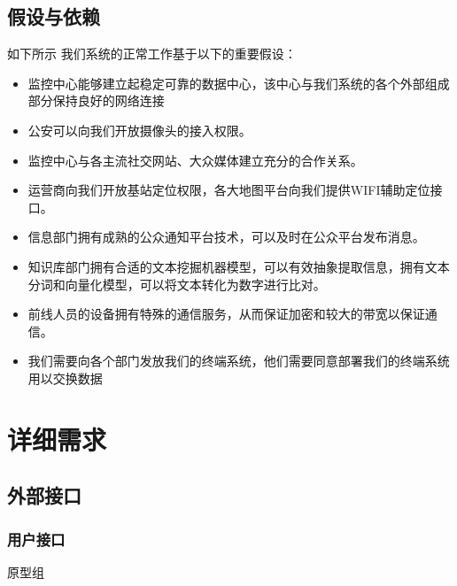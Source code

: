 \documentclass{ctexrep}
\begin{document}
\section{假设与依赖}
如下所示 我们系统的正常工作基于以下的重要假设：
\begin{itemize}
\item 监控中心能够建立起稳定可靠的数据中心，该中心与我们系统的各个外部组成部分保持良好的网络连接
\item 公安可以向我们开放摄像头的接入权限。
\item 监控中心与各主流社交网站、大众媒体建立充分的合作关系。
\item 运营商向我们开放基站定位权限，各大地图平台向我们提供WIFI辅助定位接口。
\item 信息部门拥有成熟的公众通知平台技术，可以及时在公众平台发布消息。
\item 知识库部门拥有合适的文本挖掘机器模型，可以有效抽象提取信息，拥有文本分词和向量化模型，可以将文本转化为数字进行比对。
\item 前线人员的设备拥有特殊的通信服务，从而保证加密和较大的带宽以保证通信。
\item 我们需要向各个部门发放我们的终端系统，他们需要同意部署我们的终端系统用以交换数据
\end{itemize}

\chapter{详细需求}
\section{外部接口}
\subsection{用户接口}
原型组
\end{document}
